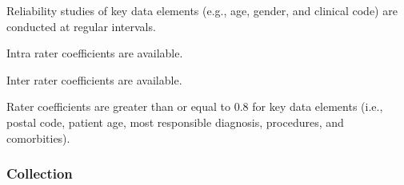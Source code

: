 \begin{QandA}
    \item Reliability studies of key data elements (e.g., age, gender, and clinical code) are conducted at regular intervals.
    \begin{answered}
        
    \end{answered}

    \item Intra rater coefficients are available.
    \begin{answered}
        
    \end{answered}

    \item Inter rater coefficients are available.
    \begin{answered}
        
    \end{answered}

    \item Rater coefficients are greater than or equal to 0.8 for key data elements (i.e., postal code, patient age, most responsible diagnosis, procedures, and comorbities).
    \begin{answered}
        
    \end{answered}

\end{QandA}

\subsubsection{Collection}

